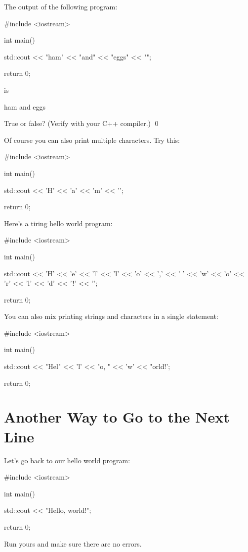 \begin{ex}
The output of the following program:
\begin{console}
#include <iostream>

int main()
{
    std::cout << "ham" << "and" << "eggs"
              << "\n";
      
    return 0;
}
\end{console}
is
\begin{console}
ham and eggs
\end{console}
True or false? (Verify with your C++ compiler.)
\qed
\end{ex}


Of course you can also print multiple characters. Try this:
\begin{console}
#include <iostream>

int main()
{
    std::cout << 'H' << 'a' << 'm' << '\n';
         
    return 0;
}
\end{console}

Here's a tiring hello world program:
\begin{console}
#include <iostream>

int main()
{
    std::cout << 'H' << 'e' << 'l' << 'l' << 'o'
              << ',' << ' ' 
              << 'w' << 'o' << 'r' << 'l' << 'd' 
              << '!' 
              << '\n';
         
    return 0;
}
\end{console}

You can also mix printing strings and characters in a single statement:
\begin{console}
#include <iostream>

int main()
{
    std::cout << "Hel" << 'l' << "o, " 
              << 'w' << "orld!\n';
         
    return 0;
}
\end{console}







\newpage\section{Another Way to Go to the Next Line}

Let's go back to our hello world program:
\begin{console}
#include <iostream>

int main()
{
    std::cout << "Hello, world!\n";

    return 0;
}
\end{console}
Run yours and make sure there are no errors.

